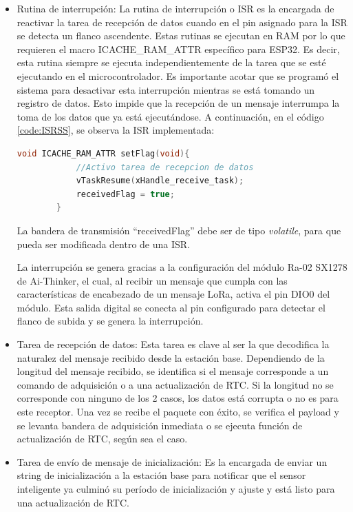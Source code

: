\begin{itemize}
    
    
    \item Rutina de interrupción: La rutina de interrupción o ISR es la encargada de reactivar la tarea de recepción de datos cuando en el pin asignado para la ISR se detecta un flanco ascendente. Estas rutinas se ejecutan en RAM por lo que requieren el macro ICACHE\_RAM\_ATTR específico para ESP32. Es decir, esta rutina siempre se ejecuta independientemente de la tarea que se esté ejecutando en el microcontrolador. Es importante acotar que se programó el sistema para desactivar esta interrupción mientras se está tomando un registro de datos. Esto impide que la recepción de un mensaje interrumpa la toma de los datos que ya está ejecutándose. A continuación, en el código \ref{code:ISRSS}, se observa la ISR implementada:
    
    \begin{lstlisting}[language=C++, caption=ISR de recepción de datos en sensor inteligente, label=code:ISRSS]
        void ICACHE_RAM_ATTR setFlag(void){  
            //Activo tarea de recepcion de datos
            vTaskResume(xHandle_receive_task);
            receivedFlag = true;
        }
    \end{lstlisting}

    La bandera de transmisión ``receivedFlag'' debe ser de tipo \textit{volatile}, para que pueda ser modificada dentro de una ISR.

    La interrupción se genera gracias a la configuración del módulo Ra-02 SX1278 de Ai-Thinker, el cual, al recibir un mensaje que cumpla con las características de encabezado de un mensaje LoRa, activa el pin DIO0 del módulo. Esta salida digital se conecta al pin configurado para detectar el flanco de subida y se genera la interrupción.
    
    \item Tarea de recepción de datos: Esta tarea es clave al ser la que decodifica la naturalez del mensaje recibido desde la estación base. Dependiendo de la longitud del mensaje recibido, se identifica si el mensaje corresponde a un comando de adquisición o a una actualización de RTC. Si la longitud no se corresponde con ninguno de los 2 casos, los datos está corrupta o no es para este receptor. Una vez se recibe el paquete con éxito, se verifica el payload y se levanta bandera de adquisición inmediata o se ejecuta función de actualización de RTC, según sea el caso.
    
    \item Tarea de envío de mensaje de inicialización: Es la encargada de enviar un string de inicialización a la estación base para notificar que el sensor inteligente ya culminó su período de inicialización y ajuste y está listo para una actualización de RTC.
    

\end{itemize}
